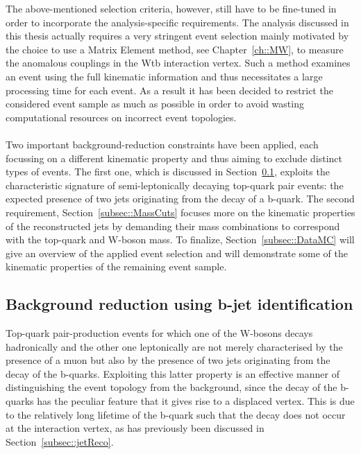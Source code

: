 The above-mentioned selection criteria, however, still have to be fine-tuned in order to incorporate the analysis-specific requirements.
The analysis discussed in this thesis actually requires a very stringent event selection mainly motivated by the choice to use a Matrix Element method, see Chapter~\ref{ch::MW}, to measure the anomalous couplings in the Wtb interaction vertex. Such a method examines an event using the full kinematic information and thus necessitates a large processing time for each event. As a result it has been decided to restrict the considered event sample as much as possible in order to avoid wasting computational resources on incorrect event topologies.
\\
\\
Two important background-reduction constraints have been applied, each focussing on a different kinematic property and thus aiming to exclude distinct types of events. 
The first one, which is discussed in Section~\ref{subsec::BTag}, exploits the characteristic signature of semi-leptonically decaying top-quark pair events: the expected presence of two jets originating from the decay of a b-quark. The second requirement, Section~\ref{subsec::MassCuts} focuses more on the kinematic properties of the reconstructed jets by demanding their mass combinations to correspond with the top-quark and W-boson mass.
To finalize, Section~\ref{subsec::DataMC} will give an overview of the applied event selection and will demonstrate some of the kinematic properties of the remaining event sample.

\subsection{Background reduction using b-jet identification}\label{subsec::BTag}

Top-quark pair-production events for which one of the W-bosons decays hadronically and the other one leptonically are not merely characterised by the presence of a muon but also by the presence of two jets originating from the decay of the b-quarks.
Exploiting this latter property is an effective manner of distinguishing the event topology from the background, since the decay of the b-quarks has the peculiar feature that it gives rise to a displaced vertex. This is due to the relatively long lifetime of the b-quark such that the decay does not occur at the interaction vertex, as has previously been discussed in Section~\ref{subsec::jetReco}.
\\ 

